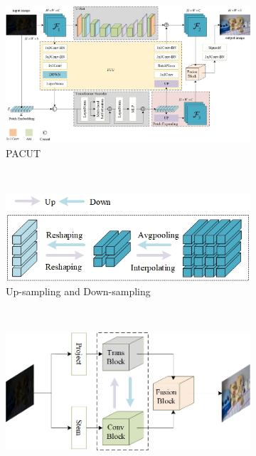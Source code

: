 \documentclass[a4paper]{ctexart}
\begin{document}
	\begin{figure}[htb] 
		\centering 		
		\begin{subfigure}{\textwidth}
			\includegraphics[width=\linewidth]{picture/LLIE/My Architecture/The proposed initial architecture.jpg}
			\captionsetup{font=scriptsize}
			\caption{PACUT}
			\label{fig: First Architecture}
		\end{subfigure}\\
		\begin{subfigure}{0.4\textwidth}
			\includegraphics[width=\linewidth]{picture/LLIE/My Architecture/Up-sampling and down-sampling}
			\captionsetup{font=scriptsize}
			\caption{Up-sampling and Down-sampling}
			\label{fig: Up-sampling and down-sampling}
		\end{subfigure} \
		\begin{subfigure}{0.4\textwidth}
			\includegraphics[width=\linewidth]{picture/LLIE/My Architecture/The proposed initial architecture(Abstract Picture)}

\end{subfigure}
\end{figure}
\end{document}
